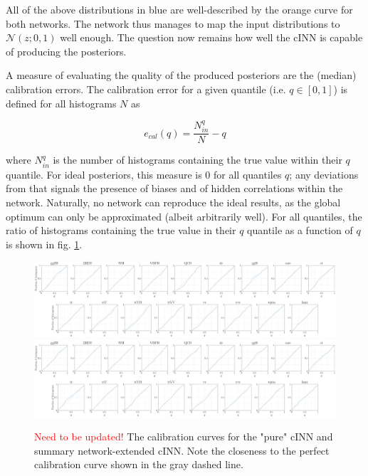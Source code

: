 All of the above distributions in blue are well-described by the orange curve for both networks. The network thus manages to map the input distributions to $\mathcal{N}(z; 0,1)$ well enough. The question now remains how well the cINN is capable of producing the posteriors.

\Subsection{\textcolor{red}{Calibration Curves}}

A measure of evaluating the quality of the produced posteriors are the (median) calibration errors. The calibration error for a given quantile (i.e. $q\in [0, 1]$) is defined for all histograms $N$ as

\begin{equation*}
	e_{cal}(q) = \frac{N^q_{in}}{N} - q
\end{equation*}

where $N^q_{in}$ is the number of histograms containing the true value within their $q$ quantile. For ideal posteriors, this measure is 0 for all quantiles $q$; any deviations from that signals the presence of biases and of hidden correlations within the network. Naturally, no network can reproduce the ideal results, as the global optimum can only be approximated (albeit arbitrarily well). For all quantiles, the ratio of histograms containing the true value in their $q$ quantile as a function of $q$ is shown in fig. \ref{fig:ecals}.

\begin{figure}[h!]
	\centering
	\includegraphics[width=\linewidth]{figures/inference/ecal}
	\includegraphics[width=\linewidth]{figures/inference/ecal_SN}
	\caption{\textcolor{red}{Need to be updated!} The calibration curves for the "pure" cINN and summary network-extended cINN. Note the closeness to the perfect calibration curve shown in the gray dashed line.}
	\label{fig:ecals}
\end{figure}


